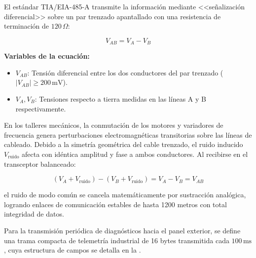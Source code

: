 El estándar TIA/EIA-485-A transmite la información mediante <<señalización diferencial>> sobre un par trenzado apantallado con una resistencia de terminación de $120\,\Omega$:

\begin{equation}
V_{AB} = V_A - V_B
\label{eq:tension_diferencial}
\end{equation}

\noindent\textbf{Variables de la ecuación:}
\begin{itemize}
    \item $V_{AB}$: Tensión diferencial entre los dos conductores del par trenzado ($|V_{AB}| \ge 200\,\text{mV}$).
    \item $V_A, V_B$: Tensiones respecto a tierra medidas en las líneas A y B respectivamente.
\end{itemize}

En los talleres mecánicos, la conmutación de los motores y variadores de frecuencia genera perturbaciones electromagnéticas transitorias sobre las líneas de cableado. Debido a la simetría geométrica del cable trenzado, el ruido inducido $V_{\text{ruido}}$ afecta con idéntica amplitud y fase a ambos conductores. Al recibirse en el transceptor balanceado:

\begin{equation}
(V_A + V_{\text{ruido}}) - (V_B + V_{\text{ruido}}) = V_A - V_B = V_{AB}
\label{eq:cancelacion_ruido}
\end{equation}

el ruido de modo común se cancela matemáticamente por sustracción analógica, logrando enlaces de comunicación estables de hasta 1200 metros con total integridad de datos.

Para la transmisión periódica de diagnósticos hacia el panel exterior, se define una trama compacta de telemetría industrial de 16 bytes transmitida cada $100\,\text{ms}$, cuya estructura de campos se detalla en la .

